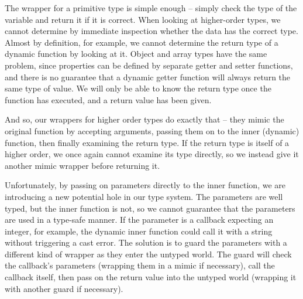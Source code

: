 \documentclass[12pt,a4paper,twoside,openright]{report}
\theoremstyle{definition}
\theoremstyle{dotless}
\begin{document}
The wrapper for a primitive type is simple enough -- simply check the type of
the variable and return it if it is correct. When looking at higher-order
types, we cannot determine by immediate inspection whether the data has the
correct type. Almost by definition, for example, we cannot determine the return
type of a dynamic function by looking at it. Object and array types have the
same problem, since properties can be defined by separate getter and setter
functions, and there is no guarantee that a dynamic getter function will always
return the same type of value. We will only be able to know the return type
once the function has executed, and a return value has been given.

And so, our wrappers for higher order types do exactly that -- they mimic the
original function by accepting arguments, passing them on to the inner
(dynamic) function, then finally examining the return type. If the return type
is itself of a higher order, we once again cannot examine its type directly, so
we instead give it another mimic wrapper before returning it. 

Unfortunately, by passing on parameters directly to the inner function, we are
introducing a new potential hole in our type system. The parameters are well
typed, but the inner function is not, so we cannot guarantee that the
parameters are used in a type-safe manner. If the parameter is a callback
expecting an integer, for example, the dynamic inner function could call it with a
string without triggering a cast error. The solution is to guard the parameters
with a different kind of wrapper as they enter the untyped world. The guard
will check the callback's parameters (wrapping them in a mimic if necessary),
call the callback itself, then pass on the return value into the untyped world
(wrapping it with another guard if necessary). 

\end{document}
